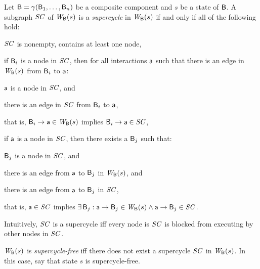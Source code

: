 \begin{definition}[Supercycle]
\label{def:supercycle} 
\label{defn:supercycle} 
Let $\mathsf{B} = \gamma(\mathsf{B}_1,\dots,\mathsf{B}_n)$ be a composite component and $s$ be a state of $\mathsf{B}$.
A subgraph $\mathit{SC}$ of $\mathit{W}_{\mathsf{B}}({s})$ is a \emph{supercycle} in $\mathit{W}_{\mathsf{B}}({s})$ if and only if all of the following hold:
\begin{nlst1}
   \item \label{def:supercycle.nonempty} \label{clause:supercycle.nonempty} 
$\mathit{SC}$ is nonempty, \ie contains at least one node,

   \item \label{def:supercycle.component-blocked} \label{clause:supercycle.component-blocked} 
if $\mathsf{B}_i$ is a node in $\mathit{SC}$, then for all interactions $\mathsf{a}$ such that
there is an edge in $\mathit{W}_{\mathsf{B}}({s})$ from $\mathsf{B}_i$ to $\mathsf{a}$:
      \begin{nlst2}
      \item $\mathsf{a}$ is a node in $\mathit{SC}$, and 
      \item there is an edge in $\mathit{SC}$ from $\mathsf{B}_i$ to $\mathsf{a}$,
      \end{nlst2}
that is, $\mathsf{B}_i \rightarrow \mathsf{a} \in \mathit{W}_{\mathsf{B}}({s})$ implies $\mathsf{B}_i \rightarrow \mathsf{a} \in \mathit{SC}$,

   \item \label{def:supercycle.action-blocked}  \label{clause:supercycle.action-blocked}  
if $\mathsf{a}$ is a node in $\mathit{SC}$, then there exists a $\mathsf{B}_j$ such that:
      \begin{nlst2}
      \item $\mathsf{B}_j$  is a node in $\mathit{SC}$, and
      \item there is an edge from $\mathsf{a}$ to $\mathsf{B}_j$ in $\mathit{W}_{\mathsf{B}}({s})$, and
      \item there is an edge from $\mathsf{a}$ to $\mathsf{B}_j$ in $\mathit{SC}$,
      \end{nlst2}
that is, $\mathsf{a} \in \mathit{SC}$ implies $\exists\, \mathsf{B}_j : \mathsf{a} \rightarrow \mathsf{B}_j \in \mathit{W}_{\mathsf{B}}({s}) \land \mathsf{a} \rightarrow \mathsf{B}_j \in \mathit{SC}$.

\end{nlst1}
\end{definition}
Intuitively, $\mathit{SC}$ is a supercycle iff every node is $\mathit{SC}$ is blocked from executing by other nodes in $\mathit{SC}$. 

\begin{definition}
\label{def:supercycle-free}
\label{defn:supercycle-free}
$\mathit{W}_{\mathsf{B}}({s})$ is \emph{supercycle-free} iff 
there does not exist a supercycle $\mathit{SC}$ in $\mathit{W}_{\mathsf{B}}({s})$. 
In this case, say that state $s$ is supercycle-free.
\end{definition}

